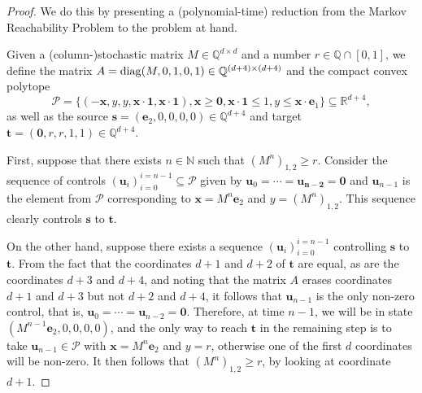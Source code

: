 \begin{proof}
We do this by presenting a (polynomial-time) reduction from the Markov Reachability Problem to the problem at hand.

Given a (column-)stochastic matrix $M \in \mathbb{Q}^{d \times d}$ and a number $r \in \mathbb{Q} \cap [0,1]$, we define the matrix $A=\operatorname{diag}(M, 0, 1, 0, 1) \in \mathbb{Q}^{(d+4)\times (d+4)}$ and
the compact convex polytope
\begin{equation*}
\mathcal{P} = \lbrace (-\boldsymbol{x}, y, y, \boldsymbol{x} \cdot \boldsymbol{1}, \boldsymbol{x} \cdot \boldsymbol{1}), \boldsymbol{x} \geq \boldsymbol{0}, \boldsymbol{x} \cdot \boldsymbol{1} \leq 1, y \leq \boldsymbol{x} \cdot \boldsymbol{e}_{1} \rbrace \subseteq \mathbb{R}^{d+4},
\end{equation*}
as well as the source $\boldsymbol{s} = (\boldsymbol{e}_{2}, 0, 0, 0, 0) \in \mathbb{Q}^{d+4}$ and target $\boldsymbol{t} = (\boldsymbol{0}, r, r, 1, 1) \in \mathbb{Q}^{d+4}$.

First, suppose that there exists $n \in \mathbb{N}$ such that $\left( M^{n} \right)_{1,2} \geq r$. Consider the sequence of controls $\left( \boldsymbol{u}_{i} \right)_{i=0}^{i=n-1} \subseteq \mathcal{P}$ given by $\boldsymbol{u}_{0} = \cdots = \boldsymbol{u_{n-2}} = \boldsymbol{0}$ and $\boldsymbol{u}_{n-1}$ is the element from $\mathcal{P}$ corresponding to $\boldsymbol{x} = M^{n} \boldsymbol{e}_{2}$ and $y=\left( M^{n} \right)_{1,2}$. This sequence clearly controls $\boldsymbol{s}$ to $\boldsymbol{t}$.

On the other hand, suppose there exists a sequence $\left( \boldsymbol{u}_{i} \right)_{i=0}^{i=n-1}$ controlling $\boldsymbol{s}$ to $\boldsymbol{t}$.
From the fact that the coordinates $d+1$ and $d+2$ of $\boldsymbol{t}$ are equal, as are the coordinates $d+3$ and $d+4$, and noting that the matrix $A$ erases coordinates $d+1$ and $d+3$ but not $d+2$ and $d+4$, it follows that $\boldsymbol{u}_{n-1}$ is the only non-zero control, that is, $\boldsymbol{u}_{0} = \cdots = \boldsymbol{u}_{n-2} = \boldsymbol{0}$.
Therefore, at time $n-1$, we will be in state $(M^{n-1} \boldsymbol{e}_{2}, 0, 0, 0, 0)$, and the only way to reach $\boldsymbol{t}$ in the remaining step is to take $\boldsymbol{u}_{n-1} \in \mathcal{P}$ with $\boldsymbol{x} = M^{n} \boldsymbol{e}_{2}$ and $y=r$, otherwise one of the first $d$ coordinates will be non-zero. It then follows that $\left( M^{n} \right)_{1,2} \geq r$, by looking at coordinate $d+1$.
\end{proof}
